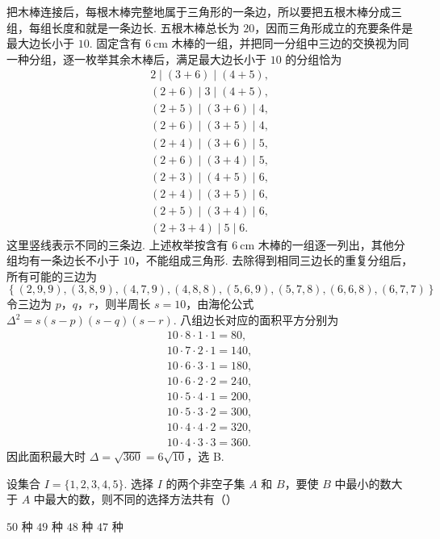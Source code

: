 \begin{solution}
把木棒连接后，每根木棒完整地属于三角形的一条边，所以要把五根木棒分成三组，每组长度和就是一条边长. 五根木棒总长为 \(20\)，因而三角形成立的充要条件是最大边长小于 \(10\). 固定含有 \(6\mathrm{~cm}\) 木棒的一组，并把同一分组中三边的交换视为同一种分组，逐一枚举其余木棒后，满足最大边长小于 \(10\) 的分组恰为
\[
\begin{gathered}
2\mid(3+6)\mid(4+5),\\
(2+6)\mid3\mid(4+5),\\
(2+5)\mid(3+6)\mid4,\\
(2+6)\mid(3+5)\mid4,\\
(2+4)\mid(3+6)\mid5,\\
(2+6)\mid(3+4)\mid5,\\
(2+3)\mid(4+5)\mid6,\\
(2+4)\mid(3+5)\mid6,\\
(2+5)\mid(3+4)\mid6,\\
(2+3+4)\mid5\mid6.
\end{gathered}
\]
这里竖线表示不同的三条边. 上述枚举按含有 \(6\mathrm{~cm}\) 木棒的一组逐一列出，其他分组均有一条边长不小于 \(10\)，不能组成三角形. 去除得到相同三边长的重复分组后，所有可能的三边为
\[
\left\{\left(2,9,9\right),\left(3,8,9\right),\left(4,7,9\right),\left(4,8,8\right),\left(5,6,9\right),\left(5,7,8\right),\left(6,6,8\right),\left(6,7,7\right)\right\}
\]
令三边为 \(p\)，\(q\)，\(r\)，则半周长 \(s=10\)，由海伦公式 \(\Delta^2=s(s-p)(s-q)(s-r)\). 八组边长对应的面积平方分别为
\[
\begin{gathered}
10\cdot8\cdot1\cdot1=80,\\
10\cdot7\cdot2\cdot1=140,\\
10\cdot6\cdot3\cdot1=180,\\
10\cdot6\cdot2\cdot2=240,\\
10\cdot5\cdot4\cdot1=200,\\
10\cdot5\cdot3\cdot2=300,\\
10\cdot4\cdot4\cdot2=320,\\
10\cdot4\cdot3\cdot3=360.
\end{gathered}
\]
因此面积最大时 \(\Delta=\sqrt{360}=6\sqrt{10}\)，选 B.
\end{solution}

\begin{problem}
设集合 \(I=\{1,2,3,4,5\}\). 选择 \(I\) 的两个非空子集 \(A\) 和 \(B\)，要使 \(B\) 中最小的数大于 \(A\) 中最大的数，则不同的选择方法共有（\quad）

\choices
    {\(50\) 种}
    {\(49\) 种}
    {\(48\) 种}
    {\(47\) 种}
\end{problem}

